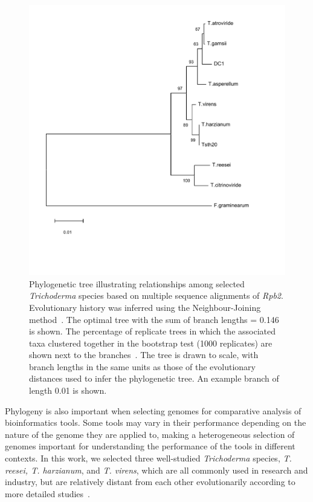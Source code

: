 \begin{figure}
    \centering
    \includegraphics[width=\textwidth]{figures/trichoderma-phylogeny-few-outgroups.pdf}
    \caption[\textit{Trichoderma} Phylogenetic tree]{Phylogenetic tree illustrating relationships among selected \textit{Trichoderma} species based on multiple sequence alignments of \textit{Rpb2}. Evolutionary history was inferred using the Neighbour-Joining method~\cite{Saitou1987}. The optimal tree with the sum of branch lengths = 0.146 is shown. The percentage of replicate trees in which the associated taxa clustered together in the bootstrap test (1000 replicates) are shown next to the branches~\cite{Felsenstein1985}. The tree is drawn to scale, with branch lengths in the same units as those of the evolutionary distances used to infer the phylogenetic tree. An example branch of length 0.01 is shown.}
    \label{fig:phylogeny}
\end{figure}

Phylogeny is also important when selecting genomes for comparative analysis of bioinformatics tools. Some tools may vary in their performance depending on the nature of the genome they are applied to, making a heterogeneous selection of genomes important for understanding the performance of the tools in different contexts. In this work, we selected three well-studied \textit{Trichoderma} species, \textit{T. reesei, T. harzianum}, and \textit{T. virens}, which are all commonly used in research and industry, but are relatively distant from each other evolutionarily according to more detailed studies~\cite{an2022}. 


